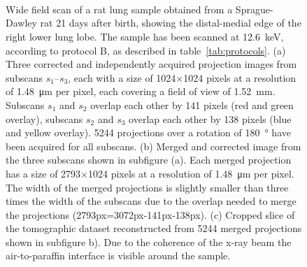 \ifiucr
	\begin{figure}%
			\caption{Wide field scan of a rat lung sample obtained from a Sprague-Dawley rat 21 days after birth, showing the distal-medial edge of the right lower lung lobe. The sample has been scanned at \SI{12.6}{\kilo\electronvolt}, according to protocol B, as described in table~\ref{tab:protocols}. %
		(a) Three corrected and independently acquired projection images from subscans $s_1$--$s_3$, each with a size of 1024\(\times\)1024 pixels at a resolution of \SI{1.48}{\micro\meter} per pixel, each covering a field of view of \SI{1.52}{\milli\meter}. Subscans $s_1$ and $s_2$ overlap each other by 141 pixels (red and green overlay), subscans $s_2$ and $s_3$ overlap each other by 138 pixels (blue and yellow overlay). 5244 projections over a rotation of \SI{180}{\degree} have been acquired for all subscans. %
		(b) Merged and corrected image from the three subscans shown in subfigure (a). Each merged projection has a size of 2793\(\times\)1024 pixels at a resolution of \SI{1.48}{\micro\meter} per pixel. The width of the merged projections is slightly smaller than three times the width of the subscans due to the overlap needed to merge the projections (2793px=3072px-141px-138px). %
		(c) Cropped slice of the tomographic dataset reconstructed from 5244 merged projections shown in subfigure b). Due to the coherence of the x-ray beam the air-to-paraffin interface is visible around the sample.%
		}%
		\label{fig:wide field scan results}%
		\\%
		\\%
		\\%
	\end{figure}%
\else
